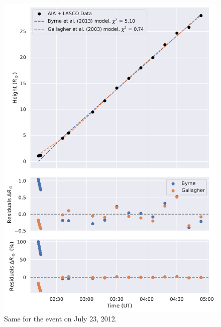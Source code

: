 \begin{figure}[!htp]
	\centering
	\includegraphics[width=0.8\hsize]{chapter2/figs/appendix/height_profile_residuals_aia_lasco_120723_01.pdf}
	\caption{Same for the event on July 23, 2012.}
\end{figure}

